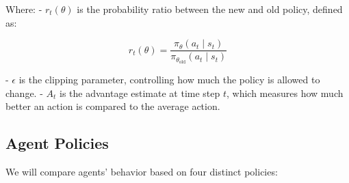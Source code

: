 Where:
- \(r_t(\theta)\) is the probability ratio between the new and old policy, defined as:

\[
r_t(\theta) = \frac{\pi_\theta(a_t \mid s_t)}{\pi_{\theta_{\text{old}}}(a_t \mid s_t)}
\]

- \(\epsilon\) is the clipping parameter, controlling how much the policy is allowed to change.
- \(A_t\) is the advantage estimate at time step \(t\), which measures how much better an action is compared to the average action.


\subsection{Agent Policies}

We will compare agents' behavior based on four distinct policies:

